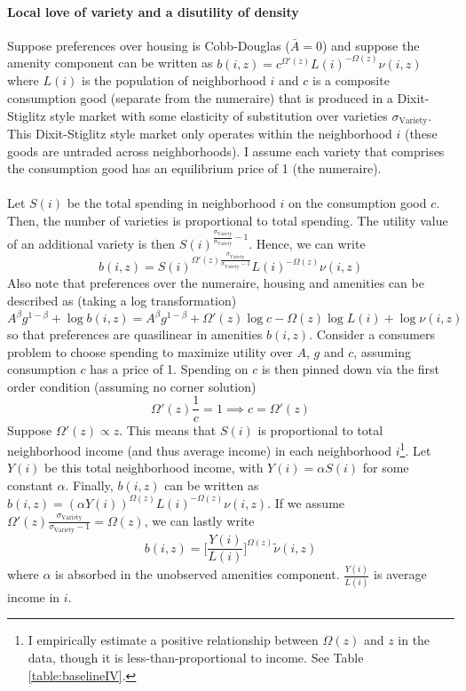 \documentclass[12pt]{article}
\begin{document}
	\paragraph*{Local love of variety and a disutility of density} Suppose preferences over housing is Cobb-Douglas ($\bar{A} = 0$) and suppose the amenity component can be written as $b(i, z) = c^{\Omega'(z)}L(i)^{-\Omega(z)}\nu(i, z)$ where $L(i)$ is the population of neighborhood $i$ and $c$ is a composite consumption good (separate from the numeraire) that is produced in a Dixit-Stiglitz style market with some elasticity of substitution over varieties $\sigma_{\text{Variety}}$. This Dixit-Stiglitz style market only operates within the neighborhood $i$ (these goods are untraded across neighborhoods). I assume each variety that comprises the consumption good has an equilibrium price of 1 (the numeraire).
	
	\paragraph*{}
	Let $S(i)$ be the total spending in neighborhood $i$ on the consumption good $c$. Then, the number of varieties is proportional to total spending. The utility value of an additional variety is then $S(i)^{\frac{\sigma_{\text{Variety}}}{\sigma_{\text{Variety}}} - 1}$. Hence, we can write 
	$$b(i, z) = S(i)^{\Omega'(z)\frac{\sigma_{\text{Variety}}}{\sigma_{\text{Variety}}-1}}L(i)^{-\Omega(z)}\nu(i,z)$$ Also note that preferences over the numeraire, housing and amenities can be described as (taking a log transformation) $$A^{\beta}g^{1-\beta} + \log b(i, z) = A^{\beta}g^{1-\beta} +  \Omega'(z)\log c - \Omega(z)\log L(i) + \log \nu(i, z) $$ so that preferences are quasilinear in amenities $b(i, z)$. Consider a consumers problem to choose spending to maximize utility over $A$, $g$ and $c$, assuming consumption $c$ has a price of 1. Spending on $c$ is then pinned down via the first order condition (assuming no corner solution) $$\Omega'(z)\frac{1}{c} = 1 \implies c = \Omega'(z)$$ Suppose $\Omega'(z) \propto z$. This means that $S(i)$ is proportional to total neighborhood income (and thus average income) in each neighborhood $i$\footnote{I empirically estimate a positive relationship between $\Omega(z)$ and $z$ in the data, though it is less-than-proportional to income. See Table \ref{table:baselineIV}. }. Let $Y(i)$ be this total neighborhood income, with $Y(i) = \alpha S(i)$ for some constant $\alpha$. Finally, $b(i, z)$ can be written as $b(i, z) = (\alpha Y(i))^{\Omega(z)}L(i)^{-\Omega(z)}\nu(i, z)$. If we assume $\Omega'(z)\frac{\sigma_{\text{Variety}}}{\sigma_{\text{Variety}} - 1} = \Omega(z)$, we can lastly write
	$$b(i, z) =  \big[\frac{Y(i)}{L(i)}\big]^{\Omega(z)}\tilde{\nu}(i, z)$$ where $\alpha$ is absorbed in the unobserved amenities component. $\frac{Y(i)}{L(i)}$ is average income in $i$.
	
\end{document}
